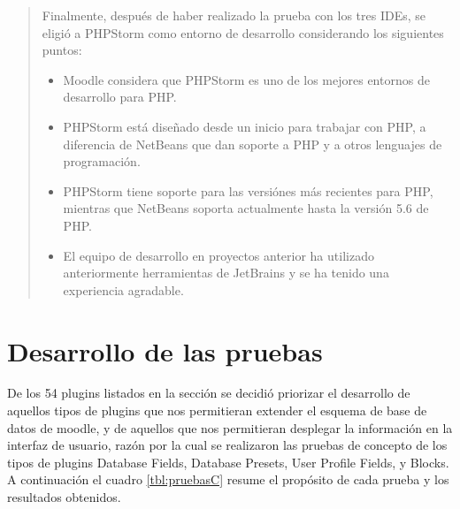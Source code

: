 
\begin{quote}
Finalmente, después de haber realizado la prueba con los  tres IDEs, se eligió a PHPStorm como entorno de desarrollo considerando los siguientes puntos:
    \begin{itemize}
    \item Moodle considera que PHPStorm es uno de los mejores entornos de desarrollo para PHP.
    \item PHPStorm está diseñado desde un inicio para trabajar con PHP, a diferencia de NetBeans que dan soporte a PHP y a otros lenguajes de programación.
    \item PHPStorm tiene soporte para las versiónes más recientes para PHP, mientras que NetBeans soporta actualmente hasta la versión 5.6 de PHP.
    \item El equipo de desarrollo en proyectos anterior ha utilizado anteriormente herramientas de JetBrains y se ha tenido una experiencia agradable. %
    \end{itemize}
\end{quote}

\section{Desarrollo de las pruebas}

    De los 54 plugins listados en la sección  se decidió priorizar el desarrollo de aquellos tipos de plugins que nos permitieran extender el esquema de base de datos de moodle, y de aquellos que nos permitieran desplegar la información en la interfaz de usuario, razón por la cual se realizaron las pruebas de concepto de los tipos de plugins Database Fields, Database Presets, User Profile Fields, y Blocks.\\
    
    \noindent A continuación el cuadro \ref{tbl:pruebasC} resume el propósito de cada prueba y los resultados obtenidos.
    
